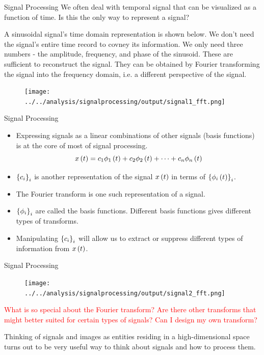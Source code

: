 \documentclass[aspectratio=169]{beamer}
\let\olditem\item
\renewcommand{\item}{\setlength{\itemsep}{\fill}\olditem}
\def\lp{\ensuremath\left(}
\def\rp{\ensuremath\right)}
\def\lc{\ensuremath\left\{}
\def\rc{\ensuremath\right\}}
\newcommand{\ct}[1]{\lp #1\rp}
\begin{document}
\begin{frame}{Signal Processing}
  We often deal with temporal signal that can be visualized as a function of time. Is this the only way to represent a signal?
  \vspace{0.2cm}

  A sinusoidal signal's time domain representation is shown below. We don't need the signal's entire time record to covney its information. We only need three numbers - the amplitude, frequency, and phase of the sinusoid. These are sufficient to reconstruct the signal. They can be obtained by Fourier transforming the signal into the frequency domain, i.e. a different perspective of the signal.
  \begin{figure}
    \centering
    \texttt{[image: ../../analysis/signalprocessing/output/signal1\_fft.png]}
  \end{figure}
\end{frame}


\begin{frame}{Signal Processing}
  \begin{itemize}
    \item Expressing signals as a linear combinations of other signals (basis functions) is at the core of most of signal processing.
    \[ x\ct{t} = c_1 \phi_1\ct{t} + c_2 \phi_2\ct{t} + \cdots + c_n \phi_n\ct{t} \]

    \item $\lc c_i \rc_{i}$ is another representation of the signal $x\ct{t}$ in terms of $\lc \phi_i\ct{t} \rc_i$.
    
    \item The Fourier transform is one such representation of a signal.
    
    \item $\lc \phi_i \rc_{i}$ are called the basis functions. Different basis functions gives different types of transforms.
    
    \item Manipulating $\lc c_i \rc_i$ will allow us to extract or suppress different types of information from $x\ct{t}$.
  \end{itemize}
\end{frame}


\begin{frame}{Signal Processing}
  \begin{figure}
    \centering
    \texttt{[image: ../../analysis/signalprocessing/output/signal2\_fft.png]}
  \end{figure}

  \textcolor{red}{What is so special about the Fourier transform? Are there other transforms that might better suited for certain types of signals? Can I design my own transform?}
  \vspace{0.2cm}

  Thinking of signals and images as entities residing in a high-dimensional space turns out to be very useful way to think about signals and how to process them.
\end{frame}
\end{document}
